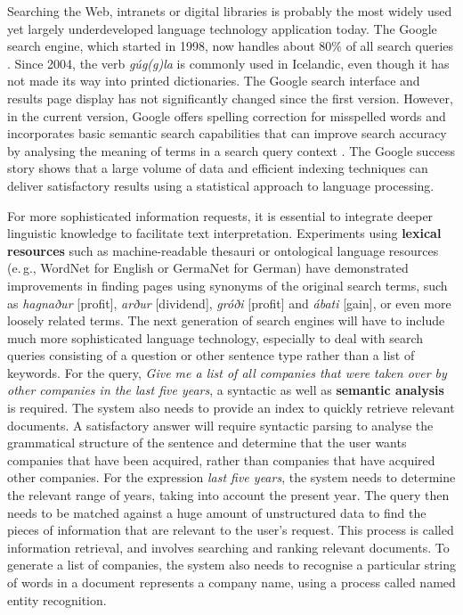 \begin{multicols}{2}
Searching the Web, intranets or digital libraries is probably the most widely used yet largely underdeveloped language technology application today. The Google search engine, which started in 1998, now handles about 80\% of all search queries \cite{spi1}. Since 2004, the verb \textit{gúg(g)la} is commonly used in Icelandic, even though it has not made its way into printed dictionaries.  The Google search interface and results page display has not significantly changed since the first version. However, in the current version, Google offers spelling correction for misspelled words and incorporates basic semantic search capabilities that can improve search accuracy by analysing the meaning of terms in a search query context \cite{pc1}. The Google success story shows that a large volume of data and efficient indexing techniques can deliver satisfactory results using a statistical approach to language processing.

For more sophisticated information requests, it is essential to integrate deeper linguistic knowledge to facilitate text interpretation. Experiments using \textbf{lexical resources} such as machine-readable thesauri or ontological language resources (e.\,g., WordNet for English or GermaNet for German) have demonstrated improvements in finding pages using synonyms of the original search terms, such as \textit{hagnaður} {[}profit{]}, \textit{arður} {[}dividend{]}, \textit{gróði} {[}profit{]} and \textit{ábati} {[}gain{]}, or even more loosely related terms.
The next generation of search engines will have to include much more sophisticated language technology, especially to deal with search queries consisting of a question or other sentence type rather than a list of keywords. For the query, \textit{Give me a list of all companies that were taken over by other companies in the last five years}, a syntactic as well as \textbf{semantic analysis} is required. The system also needs to provide an index to quickly retrieve relevant documents. A satisfactory answer will require syntactic parsing to analyse the grammatical structure of the sentence and determine that the user wants companies that have been acquired, rather than companies that have acquired other companies. For the expression \textit{last five years}, the system needs to determine the relevant range of years, taking into account the present year. The query then needs to be matched against a huge amount of unstructured data to find the pieces of information that are relevant to the user’s request. This process is called information retrieval, and involves searching and ranking relevant documents. To generate a list of companies, the system also needs to recognise a particular string of words in a document represents a company name, using a process called named entity recognition.


\end{multicols}
